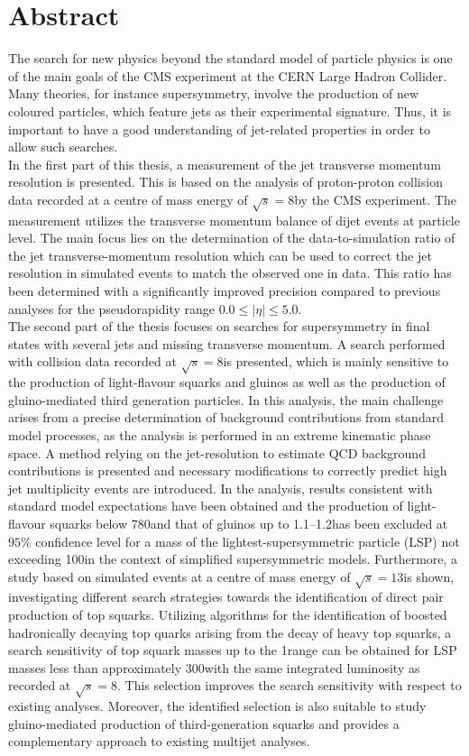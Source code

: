 \section*{Abstract}
The search for new physics beyond the standard model of particle physics is one of the main goals of the CMS experiment at the CERN Large Hadron Collider. Many theories, for instance supersymmetry, involve the production of new coloured particles, which feature jets as their experimental signature. Thus, it is important to have a good understanding of jet-related properties in order to allow such searches.\\
In the first part of this thesis, a measurement of the jet transverse momentum resolution is presented. This is based on the analysis of proton-proton collision data recorded at a centre of mass energy of $\sqrt{s}=8$\tev by the CMS experiment. The measurement utilizes the transverse momentum balance of dijet events at particle level. The main focus lies on the determination of the data-to-simulation ratio of the jet transverse-momentum resolution which can be used to correct the jet resolution in simulated events to match the observed one in data. This ratio has been determined with a significantly improved precision compared to previous analyses for the pseudorapidity range $0.0 \leq |\eta| \leq 5.0$. \\ 
The second part of the thesis focuses on searches for supersymmetry in final states with several jets and missing transverse momentum. A search performed with collision data recorded at $\sqrt{s}=8$\tev is presented, which is mainly sensitive to the production of light-flavour squarks and gluinos as well as the production of gluino-mediated third generation particles. In this analysis, the main challenge arises from a precise determination of background contributions from standard model processes, as the analysis is performed in an extreme kinematic phase space. A method relying on the jet-\pt resolution to estimate QCD background contributions is presented and necessary modifications to correctly predict high jet multiplicity events are introduced. In the analysis, results consistent with standard model expectations have been obtained and the production of light-flavour squarks below 780\gev and that of gluinos up to 1.1--1.2\tev has been excluded at $95\%$ confidence level for a mass of the lightest-supersymmetric particle (LSP) not exceeding 100\gev in the context of simplified supersymmetric models. Furthermore, a study based on simulated events at a centre of mass energy of  $\sqrt{s}=13$\tev is shown, investigating different search strategies towards the identification of direct pair production of top squarks. Utilizing algorithms for the identification of boosted hadronically decaying top quarks arising from the decay of heavy top squarks, a search sensitivity of top squark masses up to the 1\tev range can be obtained for LSP masses less than approximately 300\gev with the same integrated luminosity as recorded at $\sqrt{s}=8$\tev. This selection improves the search sensitivity with respect to existing analyses. Moreover, the identified selection is also suitable to study gluino-mediated production of third-generation squarks and provides a complementary approach to existing multijet analyses.   
